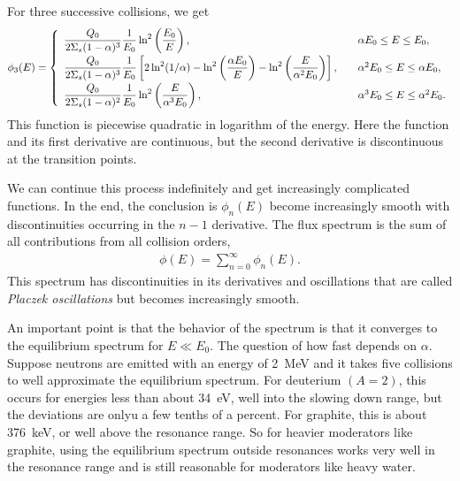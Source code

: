 For three successive collisions, we get
\begin{align}
   \phi_3(E) = \left\{ \begin{array}{l l}
   \dfrac{Q_0}{ 2 \Sigma_s ( 1 - \alpha )^3 } \dfrac{1}{E_0} \ln^2 \left( \dfrac{E_0}{E} \right), & \quad \alpha E_0 \le E \le E_0,  \vspace{0.2em} \\
   \dfrac{Q_0}{ 2 \Sigma_s ( 1 - \alpha )^3 } \dfrac{1}{E_0} \left[ 2 \ln^2 ( 1/\alpha ) - \ln^2 \left( \dfrac{\alpha E_0}{E} \right) -  \ln^2 \left( \dfrac{E}{\alpha^2 E_0} \right) \right], & \quad \alpha^2 E_0 \le E \le \alpha E_0,  \vspace{0.2em} \\
   \dfrac{Q_0}{2 \Sigma_s ( 1 - \alpha )^2 } \dfrac{1}{E_0} \ln^2 \left( \dfrac{E}{\alpha^3 E_0} \right), & \quad \alpha^3 E_0 \le E \le \alpha^2 E_0. \\ \end{array} \right.
\end{align}
This function is piecewise quadratic in logarithm of the energy. Here the function and its first derivative are continuous, but the second derivative is discontinuous at the transition points.

We can continue this process indefinitely and get increasingly complicated functions. In the end, the conclusion is $\phi_n(E)$ become increasingly smooth with discontinuities occurring in the $n-1$ derivative. The flux spectrum is the sum of all contributions from all collision orders,
\begin{align}
  \phi(E) = \sum_{n=0}^\infty \phi_n(E) .
\end{align}
This spectrum has discontinuities in its derivatives and oscillations that are called \emph{Placzek oscillations} but becomes increasingly smooth.

An important point is that the behavior of the spectrum is that it converges to the equilibrium spectrum for $E \ll E_0$. The question of how fast depends on $\alpha$. Suppose neutrons are emitted with an energy of 2~MeV and it takes five collisions to well approximate the equilibrium spectrum. For deuterium $(A = 2)$, this occurs for energies less than about 34~eV, well into the slowing down range, but the deviations are onlyu a few tenths of a percent. For graphite, this is about 376~keV, or well above the resonance range. So for heavier moderators like graphite, using the equilibrium spectrum outside resonances works very well in the resonance range and is still reasonable for moderators like heavy water. 


